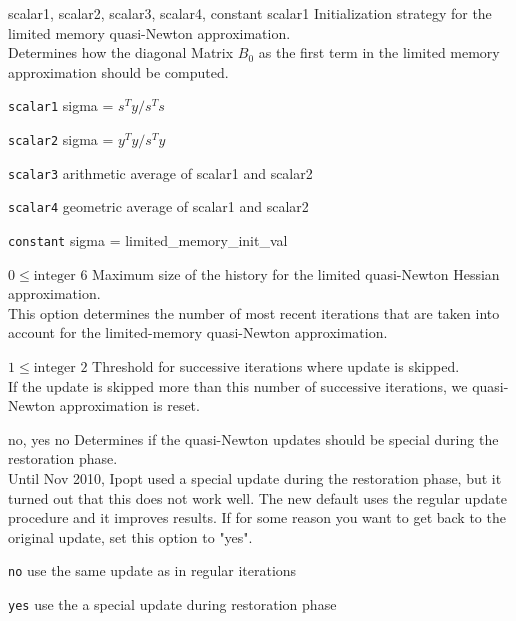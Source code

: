 %
{\ttfamily scalar1, scalar2, scalar3, scalar4, constant}%
{scalar1}%
{Initialization strategy for the limited memory quasi-Newton approximation.\\
Determines how the diagonal Matrix $B_0$ as the first term in the limited memory approximation should be computed.}%
{\begin{list}{}{
\setlength{\parsep}{0em}
\setlength{\leftmargin}{5ex}
\setlength{\labelwidth}{2ex}
\setlength{\itemindent}{0ex}
\setlength{\topsep}{0pt}}
\item[\texttt{scalar1}] sigma = $s^Ty/s^Ts$
\item[\texttt{scalar2}] sigma = $y^Ty/s^Ty$
\item[\texttt{scalar3}] arithmetic average of scalar1 and scalar2
\item[\texttt{scalar4}] geometric average of scalar1 and scalar2
\item[\texttt{constant}] sigma = limited\_memory\_init\_val
\end{list}
}

%
{$0\leq\textrm{integer}$}%
{$6$}%
{Maximum size of the history for the limited quasi-Newton Hessian approximation.\\
This option determines the number of most recent iterations that are taken into account for the limited-memory quasi-Newton approximation.}%
{}

%
{$1\leq\textrm{integer}$}%
{$2$}%
{Threshold for successive iterations where update is skipped.\\
If the update is skipped more than this number of successive iterations, we quasi-Newton approximation is reset.}%
{}

%
{\ttfamily no, yes}%
{no}%
{Determines if the quasi-Newton updates should be special during the restoration phase.\\
Until Nov 2010, Ipopt used a special update during the restoration phase, but it turned out that this does not work well.  The new default uses the regular update procedure and it improves results.  If for some reason you want to get back to the original update, set this option to "yes".}%
{\begin{list}{}{
\setlength{\parsep}{0em}
\setlength{\leftmargin}{5ex}
\setlength{\labelwidth}{2ex}
\setlength{\itemindent}{0ex}
\setlength{\topsep}{0pt}}
\item[\texttt{no}] use the same update as in regular iterations
\item[\texttt{yes}] use the a special update during restoration phase
\end{list}
}

